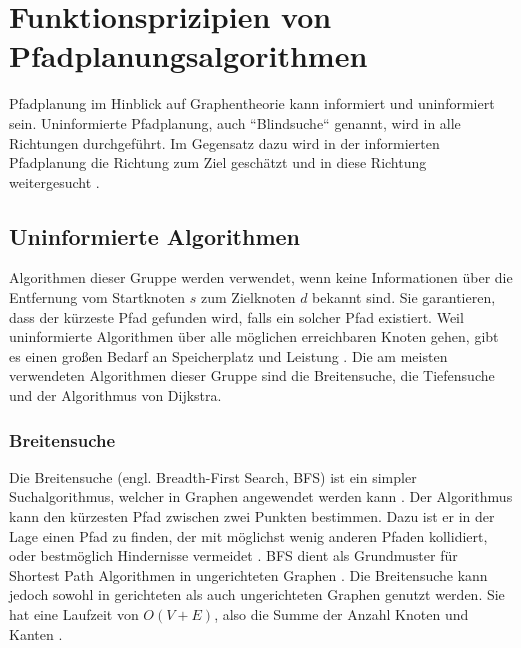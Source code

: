 
\chapter{Funktionsprizipien von Pfadplanungsalgorithmen}

Pfadplanung im Hinblick auf Graphentheorie kann informiert und uninformiert sein. Uninformierte Pfadplanung, auch ``Blindsuche`` genannt, wird in alle Richtungen durchgeführt. Im Gegensatz dazu wird in der informierten Pfadplanung die Richtung zum Ziel geschätzt und in diese Richtung weitergesucht \cite{Man18}. %

\section{Uninformierte Algorithmen}
Algorithmen dieser Gruppe werden verwendet, wenn keine Informationen über die Entfernung vom Startknoten $s$ zum Zielknoten $d$ bekannt sind. Sie garantieren, dass der kürzeste Pfad gefunden wird, falls ein solcher Pfad existiert. Weil uninformierte Algorithmen über alle möglichen erreichbaren Knoten gehen, gibt es einen großen Bedarf an Speicherplatz und Leistung \cite{Noo15}. Die am meisten verwendeten Algorithmen dieser Gruppe sind die Breitensuche, die Tiefensuche und der Algorithmus von Dijkstra.

\subsection{Breitensuche}

Die Breitensuche (engl. Breadth-First Search, BFS) ist ein simpler Suchalgorithmus, welcher in Graphen angewendet werden kann \cite[S.594]{Cormen.2009}. Der Algorithmus kann den kürzesten Pfad zwischen zwei Punkten bestimmen. Dazu ist er in der Lage einen Pfad zu finden, der mit möglichst wenig anderen Pfaden kollidiert, oder bestmöglich Hindernisse vermeidet \cite{Lee.1961}. BFS dient als Grundmuster für Shortest Path Algorithmen in ungerichteten Graphen \cite{Ottmann.2017}. Die Breitensuche kann jedoch sowohl in gerichteten als auch ungerichteten Graphen genutzt werden. Sie hat eine Laufzeit von $O(V + E)$, also die Summe der Anzahl Knoten und Kanten \cite[S.597]{Cormen.2009}.

